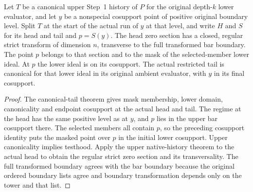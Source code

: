 \begin{theorem}
\label{hir:g1-positive-normal-phase-head}
\leanok
Let $T$ be a canonical upper Step~1 history of $P$ for the original
depth-$k$ lower evaluator, and let $y$ be a nonspecial cosupport point
of positive original boundary level. Split $T$ at the start of the
actual run of $y$ at that level, and write $H$ and $S$ for its head and
tail and $p=S(y)$. The head zero section has a closed, regular
strict transform of dimension $n$, transverse to the full transformed
bar boundary. The point $p$ belongs to that section and to the mask
of the selected-member lower ideal. At $p$ the lower ideal is on its
cosupport. The actual restricted tail is canonical for that lower
ideal in its original ambient evaluator, with $y$ in its final
cosupport.
\end{theorem}
\begin{proof}
The canonical-tail theorem gives mask membership, lower domain,
canonicality and endpoint cosupport at the actual head and tail.
The regime at the head has the same positive level as at $y$, and
$p$ lies in the upper bar cosupport there. The selected members all
contain $p$, so the preceding cosupport identity puts the masked
point over $p$ in the initial lower cosupport. Upper canonicality
implies testhood. Apply the upper native-history theorem to the
actual head to obtain the regular strict zero section and its
transversality. The full transformed boundary agrees with the bar
boundary because the original ordered boundary lists agree and
boundary transformation depends only on the tower and that list.
\end{proof}

